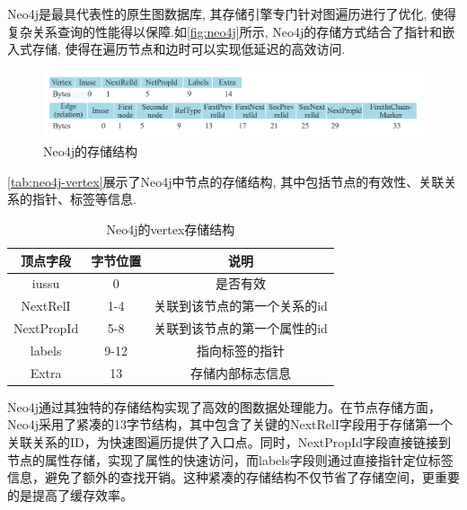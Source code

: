 \documentclass[12pt,hyperref,a4paper,UTF8]{ctexart}
\begin{document}
Neo4j是最具代表性的原生图数据库, 其存储引擎专门针对图遍历进行了优化, 使得复杂关系查询的性能得以保障.如\autoref{fig:neo4j}所示, Neo4j的存储方式结合了指针和嵌入式存储, 使得在遍历节点和边时可以实现低延迟的高效访问.
\begin{figure}[H]
	\centering
	\includegraphics[width=1\textwidth]{images/4.png}
	\caption{Neo4j的存储结构}
	\label{fig:neo4j}
\end{figure}

\autoref{tab:neo4j-vertex}展示了Neo4j中节点的存储结构, 其中包括节点的有效性、关联关系的指针、标签等信息.
\begin{table}[H]
	\centering
	\caption{Neo4j的vertex存储结构}
	\begin{tabular}{|c|c|c|}
		\hline
		顶点字段       & 字节位置 & 说明              \\
		\hline
		iussu      & 0    & 是否有效            \\
		NextRelI   & 1-4  & 关联到该节点的第一个关系的id \\
		NextPropId & 5-8  & 关联到该节点的第一个属性的id \\
		labels     & 9-12 & 指向标签的指针         \\
		Extra      & 13   & 存储内部标志信息        \\
		\hline
	\end{tabular}
	\label{tab:neo4j-vertex}
\end{table}
Neo4j通过其独特的存储结构实现了高效的图数据处理能力。在节点存储方面，Neo4j采用了紧凑的13字节结构，其中包含了关键的NextRelI字段用于存储第一个关联关系的ID，为快速图遍历提供了入口点。同时，NextPropId字段直接链接到节点的属性存储，实现了属性的快速访问，而labels字段则通过直接指针定位标签信息，避免了额外的查找开销。这种紧凑的存储结构不仅节省了存储空间，更重要的是提高了缓存效率。
\end{document}
